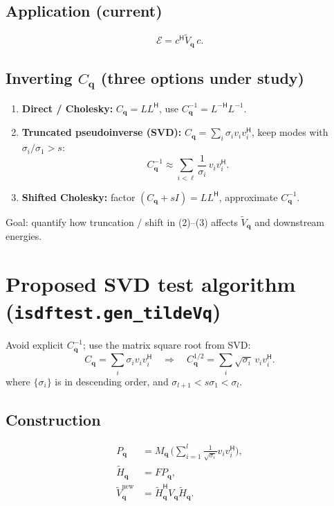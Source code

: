 \documentclass[11pt]{article}
\newcommand{\qq}{\mathbf{q}}
\newcommand{\herm}{^{\mathsf{H}}}
\begin{document}
\subsection{Application (current)}
\begin{equation}
  \mathcal{E} = c^{\mathsf{H}} \tilde{V}_{\qq}\, c.
\end{equation}

\subsection{Inverting $C_{\qq}$ (three options under study)}
\begin{enumerate}
  \item \textbf{Direct / Cholesky:} $C_{\qq} = L L^{\mathsf{H}}$, use $C_{\qq}^{-1} = L^{-\mathsf{H}} L^{-1}$.
  \item \textbf{Truncated pseudoinverse (SVD):}
  $C_{\qq} = \sum_i \sigma_i v_i v_i^{\mathsf{H}}$, keep modes with $\sigma_i/\sigma_1 > s$:
  \[
    C_{\qq}^{-1} \approx \sum_{i < \ell} \frac{1}{\sigma_i}\, v_i v_i^{\mathsf{H}}.
  \]
  \item \textbf{Shifted Cholesky:} factor $(C_{\qq} + s I) = L L^{\mathsf{H}}$, approximate $C_{\qq}^{-1}$.
\end{enumerate}
Goal: quantify how truncation / shift in (2)--(3) affects $\tilde{V}_{\qq}$ and downstream energies.

\section{Proposed SVD test algorithm (\texttt{isdftest.gen\_tildeVq})}

Avoid explicit $C_{\qq}^{-1}$; use the matrix square root from SVD:
\begin{equation}
  C_{\qq} = \sum_i \sigma_i v_i v_i^{\mathsf{H}}
  \quad\Longrightarrow\quad
  C_{\qq}^{1/2} = \sum_i \sqrt{\sigma_i}\, v_i v_i^{\mathsf{H}}.
\end{equation}
where $\{\sigma_i\}$ is in descending order, and $\sigma_{l+1} < s\sigma_1 < \sigma_l$.

\subsection{Construction}
\begin{align}
  P_{\qq} &= M_{\qq}\, \bigl(\sum_{i=1}^l \frac{1}{\sqrt{\sigma_i}} v_i v_i\herm \bigr), \\
  \tilde{H}_{\qq} &= F P_{\qq}, \\
  \tilde{V}_{\qq}^{\mathrm{new}} &= \tilde{H}_{\qq}^{\mathsf{H}} V_{\qq} \tilde{H}_{\qq}.
\end{align}
\end{document}
